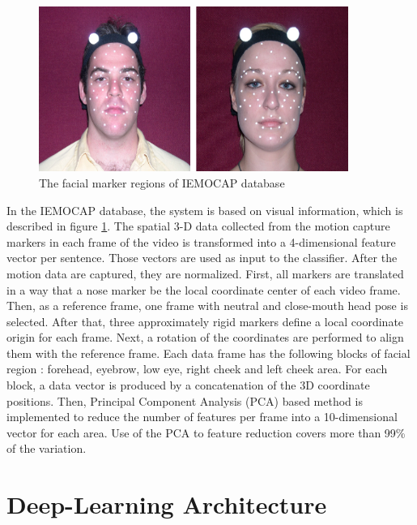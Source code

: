 \begin{figure}
\centering
   \includegraphics[width=0.9\textwidth]{Chapters/IEMOCAP_FACE.png}
\caption[The facial marker regions of IEMOCAP database]{The facial marker regions of IEMOCAP database }
\label{fig:IEMOCAP_FACE}
\end{figure}



In the IEMOCAP database, the system is based on visual information, which is described in figure \ref{fig:IEMOCAP_FACE}. The spatial 3-D data collected from the motion capture markers in each frame of the video is transformed into a 4-dimensional feature vector per sentence. Those vectors are used as input to the classifier.  After the motion data are captured, they are normalized. First, all markers are translated in a  way that a nose marker be the local coordinate center of each video frame. Then, as  a reference frame, one frame with neutral and close-mouth head pose is selected. After that, three approximately rigid markers define a local coordinate origin for each frame. Next, a rotation of the coordinates are performed to align them with the reference frame. Each data frame has the following blocks of facial region : forehead, eyebrow, low eye, right cheek and left cheek area. For each block, a data vector is produced by a concatenation of the 3D coordinate positions. Then, Principal Component Analysis (PCA) based method is implemented to reduce the number of features per frame into a 10-dimensional vector for each area. Use of the PCA to feature reduction covers more than 99\% of the variation. 

\newpage
\chapter{Deep-Learning Architecture}

